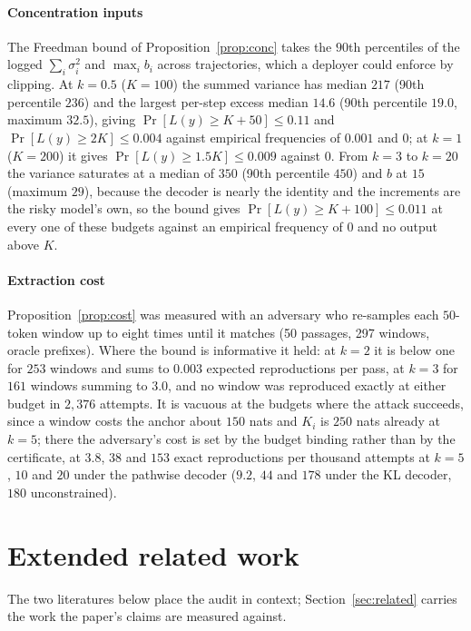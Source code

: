 \paragraph{Concentration inputs}
The Freedman bound of Proposition~\ref{prop:conc} takes the $90$th percentiles of the logged $\sum_i \sigma_i^2$ and $\max_i b_i$ across trajectories, which a deployer could enforce by clipping. At $k=0.5$ ($K=100$) the summed variance has median $217$ (90th percentile $236$) and the largest per-step excess median $14.6$ (90th percentile $19.0$, maximum $32.5$), giving $\Pr[L(y) \ge K+50] \le 0.11$ and $\Pr[L(y) \ge 2K] \le 0.004$ against empirical frequencies of $0.001$ and $0$; at $k=1$ ($K=200$) it gives $\Pr[L(y) \ge 1.5K] \le 0.009$ against $0$. From $k=3$ to $k=20$ the variance saturates at a median of $350$ (90th percentile $450$) and $b$ at $15$ (maximum $29$), because the decoder is nearly the identity and the increments are the risky model's own, so the bound gives $\Pr[L(y) \ge K+100] \le 0.011$ at every one of these budgets against an empirical frequency of $0$ and no output above $K$.

\paragraph{Extraction cost}
Proposition~\ref{prop:cost} was measured with an adversary who re-samples each $50$-token window up to eight times until it matches (50 passages, 297 windows, oracle prefixes). Where the bound is informative it held: at $k=2$ it is below one for $253$ windows and sums to $0.003$ expected reproductions per pass, at $k=3$ for $161$ windows summing to $3.0$, and no window was reproduced exactly at either budget in $2{,}376$ attempts. It is vacuous at the budgets where the attack succeeds, since a window costs the anchor about $150$ nats and $K_i$ is $250$ nats already at $k=5$; there the adversary's cost is set by the budget binding rather than by the certificate, at $3.8$, $38$ and $153$ exact reproductions per thousand attempts at $k=5$, $10$ and $20$ under the pathwise decoder ($9.2$, $44$ and $178$ under the KL decoder, $180$ unconstrained).

\section{Extended related work}\label{app:related}
The two literatures below place the audit in context; Section~\ref{sec:related} carries the work the paper's claims are measured against.

